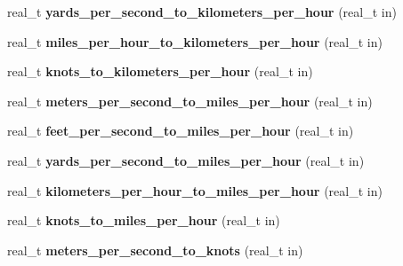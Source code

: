 \begin{DoxyCompactItemize}
\item 
\hypertarget{namespaceetk_af5952232344ccfc0f50e3d65b4b2bd6a}{real\-\_\-t {\bfseries yards\-\_\-per\-\_\-second\-\_\-to\-\_\-kilometers\-\_\-per\-\_\-hour} (real\-\_\-t in)}\label{namespaceetk_af5952232344ccfc0f50e3d65b4b2bd6a}

\item 
\hypertarget{namespaceetk_aaf066eb03de288cd16ce8e725cfe85c6}{real\-\_\-t {\bfseries miles\-\_\-per\-\_\-hour\-\_\-to\-\_\-kilometers\-\_\-per\-\_\-hour} (real\-\_\-t in)}\label{namespaceetk_aaf066eb03de288cd16ce8e725cfe85c6}

\item 
\hypertarget{namespaceetk_a94a223d087477bca96539bf7debd49f6}{real\-\_\-t {\bfseries knots\-\_\-to\-\_\-kilometers\-\_\-per\-\_\-hour} (real\-\_\-t in)}\label{namespaceetk_a94a223d087477bca96539bf7debd49f6}

\item 
\hypertarget{namespaceetk_ab61ea044e7bb1ce5dd36906e5bbb2aa9}{real\-\_\-t {\bfseries meters\-\_\-per\-\_\-second\-\_\-to\-\_\-miles\-\_\-per\-\_\-hour} (real\-\_\-t in)}\label{namespaceetk_ab61ea044e7bb1ce5dd36906e5bbb2aa9}

\item 
\hypertarget{namespaceetk_a5e5e82d10c4b32f5455093366711efd6}{real\-\_\-t {\bfseries feet\-\_\-per\-\_\-second\-\_\-to\-\_\-miles\-\_\-per\-\_\-hour} (real\-\_\-t in)}\label{namespaceetk_a5e5e82d10c4b32f5455093366711efd6}

\item 
\hypertarget{namespaceetk_a7c612163672be56f68dfb59a84c4cd86}{real\-\_\-t {\bfseries yards\-\_\-per\-\_\-second\-\_\-to\-\_\-miles\-\_\-per\-\_\-hour} (real\-\_\-t in)}\label{namespaceetk_a7c612163672be56f68dfb59a84c4cd86}

\item 
\hypertarget{namespaceetk_a40b61c7683d9e8a4a9552ea9082b9d7e}{real\-\_\-t {\bfseries kilometers\-\_\-per\-\_\-hour\-\_\-to\-\_\-miles\-\_\-per\-\_\-hour} (real\-\_\-t in)}\label{namespaceetk_a40b61c7683d9e8a4a9552ea9082b9d7e}

\item 
\hypertarget{namespaceetk_a8eace57ad7b3e88384d91b0932605dfc}{real\-\_\-t {\bfseries knots\-\_\-to\-\_\-miles\-\_\-per\-\_\-hour} (real\-\_\-t in)}\label{namespaceetk_a8eace57ad7b3e88384d91b0932605dfc}

\item 
\hypertarget{namespaceetk_a58d1d3ee9f7f41b3c23562398860245a}{real\-\_\-t {\bfseries meters\-\_\-per\-\_\-second\-\_\-to\-\_\-knots} (real\-\_\-t in)}\label{namespaceetk_a58d1d3ee9f7f41b3c23562398860245a}


\end{DoxyCompactItemize}
